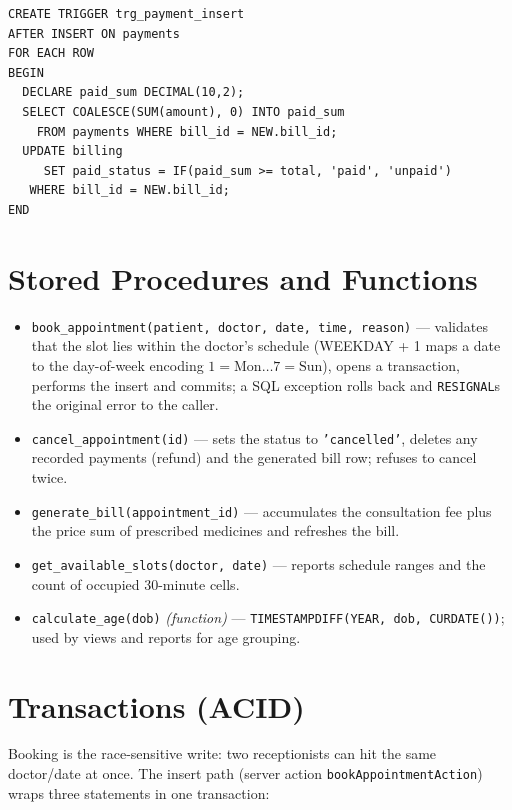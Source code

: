 \documentclass[11pt]{article}
\begin{document}
\begin{lstlisting}
CREATE TRIGGER trg_payment_insert
AFTER INSERT ON payments
FOR EACH ROW
BEGIN
  DECLARE paid_sum DECIMAL(10,2);
  SELECT COALESCE(SUM(amount), 0) INTO paid_sum
    FROM payments WHERE bill_id = NEW.bill_id;
  UPDATE billing
     SET paid_status = IF(paid_sum >= total, 'paid', 'unpaid')
   WHERE bill_id = NEW.bill_id;
END
\end{lstlisting}

\section{Stored Procedures and Functions}
\begin{itemize}
  \item \texttt{book\_appointment(patient, doctor, date, time, reason)} ---
        validates that the slot lies within the doctor's schedule
        (WEEKDAY + 1 maps a date to the day-of-week encoding
        $1{=}\text{Mon} \dots 7{=}\text{Sun}$), opens a transaction, performs
        the insert and commits; a SQL exception rolls back and
        \texttt{RESIGNAL}s the original error to the caller.
  \item \texttt{cancel\_appointment(id)} --- sets the status to
        \texttt{'cancelled'}, deletes any recorded payments (refund) and the
        generated bill row; refuses to cancel twice.
  \item \texttt{generate\_bill(appointment\_id)} --- accumulates the
        consultation fee plus the price sum of prescribed medicines and
        refreshes the bill.
  \item \texttt{get\_available\_slots(doctor, date)} --- reports schedule
        ranges and the count of occupied 30-minute cells.
  \item \texttt{calculate\_age(dob)} \emph{(function)} ---
        \texttt{TIMESTAMPDIFF(YEAR, dob, CURDATE())}; used by views and
        reports for age grouping.
\end{itemize}

\section{Transactions (ACID)}
Booking is the race-sensitive write: two receptionists can hit the same
doctor/date at once. The insert path (server action
\texttt{bookAppointmentAction}) wraps three statements in one transaction:
\end{document}
